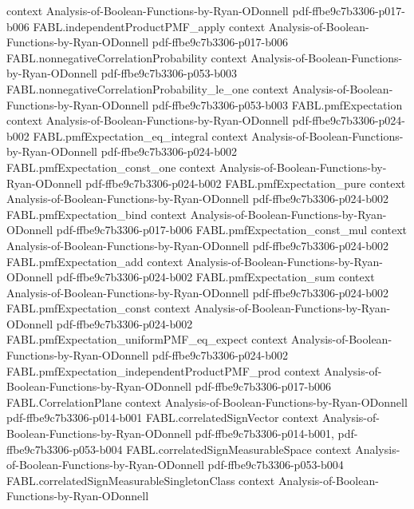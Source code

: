\begin{theorem}
  {context}
  {Analysis-of-Boolean-Functions-by-Ryan-ODonnell}
  {pdf-ffbe9c7b3306-p017-b006}
\proofstep
  {FABL.independentProductPMF_apply}
  {context}
  {Analysis-of-Boolean-Functions-by-Ryan-ODonnell}
  {pdf-ffbe9c7b3306-p017-b006}
\proofstep
  {FABL.nonnegativeCorrelationProbability}
  {context}
  {Analysis-of-Boolean-Functions-by-Ryan-ODonnell}
  {pdf-ffbe9c7b3306-p053-b003}
\proofstep
  {FABL.nonnegativeCorrelationProbability_le_one}
  {context}
  {Analysis-of-Boolean-Functions-by-Ryan-ODonnell}
  {pdf-ffbe9c7b3306-p053-b003}
\proofstep
  {FABL.pmfExpectation}
  {context}
  {Analysis-of-Boolean-Functions-by-Ryan-ODonnell}
  {pdf-ffbe9c7b3306-p024-b002}
\proofstep
  {FABL.pmfExpectation_eq_integral}
  {context}
  {Analysis-of-Boolean-Functions-by-Ryan-ODonnell}
  {pdf-ffbe9c7b3306-p024-b002}
\proofstep
  {FABL.pmfExpectation_const_one}
  {context}
  {Analysis-of-Boolean-Functions-by-Ryan-ODonnell}
  {pdf-ffbe9c7b3306-p024-b002}
\proofstep
  {FABL.pmfExpectation_pure}
  {context}
  {Analysis-of-Boolean-Functions-by-Ryan-ODonnell}
  {pdf-ffbe9c7b3306-p024-b002}
\proofstep
  {FABL.pmfExpectation_bind}
  {context}
  {Analysis-of-Boolean-Functions-by-Ryan-ODonnell}
  {pdf-ffbe9c7b3306-p017-b006}
\proofstep
  {FABL.pmfExpectation_const_mul}
  {context}
  {Analysis-of-Boolean-Functions-by-Ryan-ODonnell}
  {pdf-ffbe9c7b3306-p024-b002}
\proofstep
  {FABL.pmfExpectation_add}
  {context}
  {Analysis-of-Boolean-Functions-by-Ryan-ODonnell}
  {pdf-ffbe9c7b3306-p024-b002}
\proofstep
  {FABL.pmfExpectation_sum}
  {context}
  {Analysis-of-Boolean-Functions-by-Ryan-ODonnell}
  {pdf-ffbe9c7b3306-p024-b002}
\proofstep
  {FABL.pmfExpectation_const}
  {context}
  {Analysis-of-Boolean-Functions-by-Ryan-ODonnell}
  {pdf-ffbe9c7b3306-p024-b002}
\proofstep
  {FABL.pmfExpectation_uniformPMF_eq_expect}
  {context}
  {Analysis-of-Boolean-Functions-by-Ryan-ODonnell}
  {pdf-ffbe9c7b3306-p024-b002}
\proofstep
  {FABL.pmfExpectation_independentProductPMF_prod}
  {context}
  {Analysis-of-Boolean-Functions-by-Ryan-ODonnell}
  {pdf-ffbe9c7b3306-p017-b006}
\proofstep
  {FABL.CorrelationPlane}
  {context}
  {Analysis-of-Boolean-Functions-by-Ryan-ODonnell}
  {pdf-ffbe9c7b3306-p014-b001}
\proofstep
  {FABL.correlatedSignVector}
  {context}
  {Analysis-of-Boolean-Functions-by-Ryan-ODonnell}
  {pdf-ffbe9c7b3306-p014-b001,
    pdf-ffbe9c7b3306-p053-b004}
\proofstep
  {FABL.correlatedSignMeasurableSpace}
  {context}
  {Analysis-of-Boolean-Functions-by-Ryan-ODonnell}
  {pdf-ffbe9c7b3306-p053-b004}
\proofstep
  {FABL.correlatedSignMeasurableSingletonClass}
  {context}
  {Analysis-of-Boolean-Functions-by-Ryan-ODonnell}

\end{theorem}
